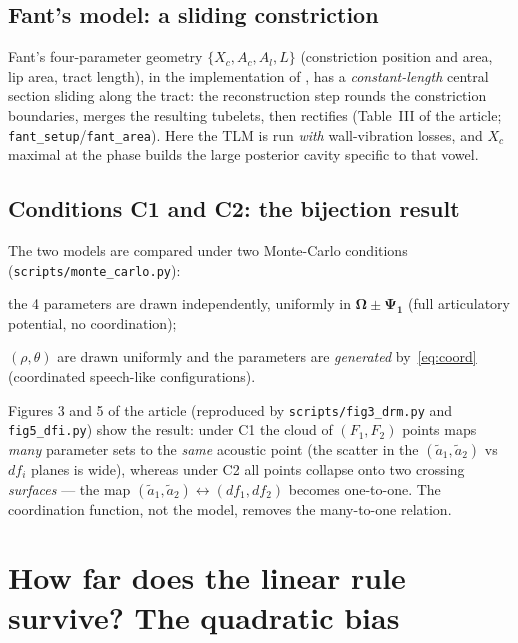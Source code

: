 \documentclass[11pt]{article}
\newcommand{\code}[1]{\texttt{#1}}
\theoremstyle{definition}
\theoremstyle{remark}
\newcommand{\Fone}{F_1}
\newcommand{\Ftwo}{F_2}
\begin{document}
\subsection{Fant's model: a sliding constriction}

Fant's four-parameter geometry $\{X_c,A_c,A_l,L\}$ (constriction position
and area, lip area, tract length), in the implementation of
\citet{Badin1990}, has a \emph{constant-length} central section sliding
along the tract: the reconstruction step rounds the constriction
boundaries, merges the resulting tubelets, then rectifies
(Table~III of the article; \code{fant\_setup}/\code{fant\_area}).  Here
the TLM is run \emph{with} wall-vibration losses, and $X_c$ maximal at
the \textipa{[i]} phase builds the large posterior cavity specific to
that vowel.

\subsection{Conditions C1 and C2: the bijection result}

The two models are compared under two Monte-Carlo conditions
(\code{scripts/monte\_carlo.py}):
\begin{description}[font=\normalfont\itshape, nosep]
\item[C1] the 4 parameters are drawn independently, uniformly in
      $\bm{\Omega}\pm\bm{\Psi_1}$ (full articulatory potential, no
      coordination);
\item[C2] $(\rho,\theta)$ are drawn uniformly and the parameters are
      \emph{generated} by~\eqref{eq:coord} (coordinated speech-like
      configurations).
\end{description}
Figures 3 and 5 of the article (reproduced by
\code{scripts/fig3\_drm.py} and \code{fig5\_dfi.py}) show the result:
under C1 the cloud of $(\Fone,\Ftwo)$ points maps \emph{many} parameter
sets to the \emph{same} acoustic point (the scatter in the
$(\tilde a_1,\tilde a_2)$ vs $df_i$ planes is wide), whereas under C2 all
points collapse onto two crossing \emph{surfaces} --- the map
$(\tilde a_1,\tilde a_2)\leftrightarrow(df_1,df_2)$ becomes
one-to-one.  The coordination function, not the model, removes the
many-to-one relation.

\section{How far does the linear rule survive? The quadratic bias}
\label{sec:bias}
\end{document}
